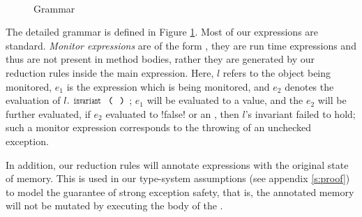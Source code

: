 \begin{figure}
\begin{grammatica}
		
		\\
		\\
		\\
		\\
		\\
		\\
	\end{grammatica}%
\SS[1]\caption{Grammar}\label{f:grammar}\SS[1.5]
\end{figure}


The detailed grammar is defined in Figure \ref{f:grammar}. 
Most of our expressions are standard.
\emph{Monitor expressions}
 are of the form , they 
are run time expressions and thus are not present in method bodies, rather they are generated by our reduction rules inside the main expression. Here, $l$ refers to the object being monitored, $e_1$ is the expression which is being monitored, and $e_2$ denotes the evaluation of $l.\invariant$; $e_1$ will be evaluated to a value, and the $e_2$ will be further evaluated, if $e_2$ evaluated to \Q!false! or an \error, then $l$'s invariant failed to hold; such a monitor expression corresponds to the throwing of an unchecked exception.

In addition, our reduction rules will annotate \Q@try@ expressions with
the original state of memory. This is used in our type-system assumptions (see appendix \ref{s:proof}) to model the guarantee of strong exception safety, that is, the annotated memory will not be mutated by executing the body of the \Q@try@.

